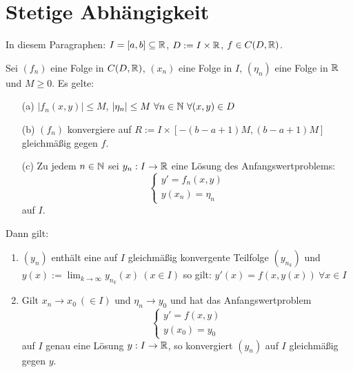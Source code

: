 \documentclass[a4paper,twoside,DIV15,BCOR12mm]{scrbook}
\begin{document}
\chapter{Stetige Abhängigkeit}

In diesem Paragraphen: $I = [a,b]\subseteq \mathbb{R}$, $D:= I\times \mathbb{R}$, $f\in C(D,\mathbb{R})$.

\begin{satz}
Sei $(f_n)$ eine Folge in $C(D,\mathbb{R})$, $(x_n)$ eine Folge in $I$, $(\eta_n)$ eine Folge in $\mathbb{R}$ und $M\ge 0$. Es gelte:
\begin{enumerate}
\item[(a)] $|f_n(x,y)| \le M$, $|\eta_n|\le M\ \forall n\in\mathbb{N} \ \forall (x,y)\in D$
\item[(b)] $(f_n)$ konvergiere auf $R:= I \times [-(b-a+1)M, (b-a+1)M ]$ gleichmäßig gegen $f$.
\item[(c)] Zu jedem $n\in\mathbb{N}$ sei $y_n: I \to \mathbb{R}$ eine Lösung des Anfangswertproblems:
\[ \begin{cases} y'=f_n(x,y) \\ y(x_n) = \eta_n \end{cases} \]
auf $I$.
\end{enumerate}
Dann gilt: 
\begin{enumerate}
\item $(y_n)$ enthält eine auf $I$ gleichmäßig konvergente Teilfolge $(y_{n_k})$ und $y(x) := \lim_{k\to\infty} y_{n_k}(x) \ (x\in I)$ so gilt: $y'(x)  =f(x,y(x))\ \forall x\in I$
\item  Gilt $x_n\to x_0\ (\in I)$ und $\eta_n\to y_0$ und hat das Anfangswertproblem 
\[
\begin{cases}
y'=f(x,y) \\ y(x_0)= y_0
\end{cases}\]
auf $I$ genau eine Lösung $y:I\to\mathbb{R}$, so konvergiert $(y_n)$ auf $I$ gleichmäßig gegen $y$.
\end{enumerate}
\end{satz}
\end{document}
